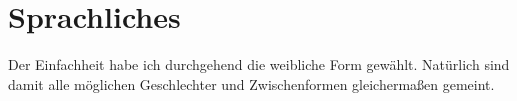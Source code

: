 \section*{Sprachliches}

Der Einfachheit habe ich durchgehend die weibliche Form gewählt. Natürlich sind damit alle möglichen Geschlechter und Zwischenformen gleichermaßen gemeint.
